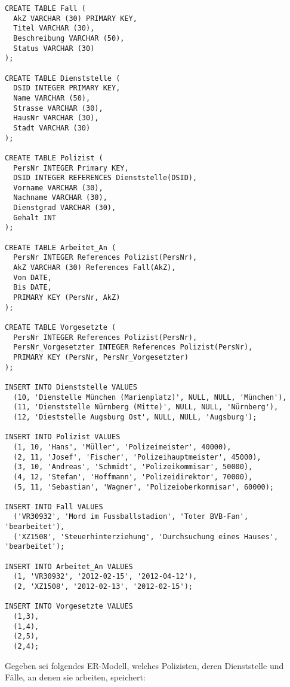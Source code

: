 \documentclass{lehramt-informatik-aufgabe}
\begin{document}
\begin{verbatim}
CREATE TABLE Fall (
  AkZ VARCHAR (30) PRIMARY KEY,
  Titel VARCHAR (30),
  Beschreibung VARCHAR (50),
  Status VARCHAR (30)
);

CREATE TABLE Dienststelle (
  DSID INTEGER PRIMARY KEY,
  Name VARCHAR (50),
  Strasse VARCHAR (30),
  HausNr VARCHAR (30),
  Stadt VARCHAR (30)
);

CREATE TABLE Polizist (
  PersNr INTEGER Primary KEY,
  DSID INTEGER REFERENCES Dienststelle(DSID),
  Vorname VARCHAR (30),
  Nachname VARCHAR (30),
  Dienstgrad VARCHAR (30),
  Gehalt INT
);

CREATE TABLE Arbeitet_An (
  PersNr INTEGER References Polizist(PersNr),
  AkZ VARCHAR (30) References Fall(AkZ),
  Von DATE,
  Bis DATE,
  PRIMARY KEY (PersNr, AkZ)
);

CREATE TABLE Vorgesetzte (
  PersNr INTEGER References Polizist(PersNr),
  PersNr_Vorgesetzter INTEGER References Polizist(PersNr),
  PRIMARY KEY (PersNr, PersNr_Vorgesetzter)
);

INSERT INTO Dienststelle VALUES
  (10, 'Dienstelle München (Marienplatz)', NULL, NULL, 'München'),
  (11, 'Dienststelle Nürnberg (Mitte)', NULL, NULL, 'Nürnberg'),
  (12, 'Dieststelle Augsburg Ost', NULL, NULL, 'Augsburg');

INSERT INTO Polizist VALUES
  (1, 10, 'Hans', 'Müller', 'Polizeimeister', 40000),
  (2, 11, 'Josef', 'Fischer', 'Polizeihauptmeister', 45000),
  (3, 10, 'Andreas', 'Schmidt', 'Polizeikommisar', 50000),
  (4, 12, 'Stefan', 'Hoffmann', 'Polizeidirektor', 70000),
  (5, 11, 'Sebastian', 'Wagner', 'Polizeioberkommisar', 60000);

INSERT INTO Fall VALUES
  ('VR30932', 'Mord im Fussballstadion', 'Toter BVB-Fan', 'bearbeitet'),
  ('XZ1508', 'Steuerhinterziehung', 'Durchsuchung eines Hauses', 'bearbeitet');

INSERT INTO Arbeitet_An VALUES
  (1, 'VR30932', '2012-02-15', '2012-04-12'),
  (2, 'XZ1508', '2012-02-13', '2012-02-15');

INSERT INTO Vorgesetzte VALUES
  (1,3),
  (1,4),
  (2,5),
  (2,4);
\end{verbatim}

\noindent
Gegeben sei folgendes ER-Modell, welches Polizisten, deren Dienststelle
und Fälle, an denen sie arbeiten, speichert:
\end{document}
